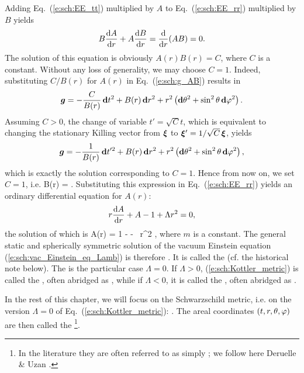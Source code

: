 Adding Eq.~(\ref{e:sch:EE_tt}) multiplied by $A$ to
Eq.~(\ref{e:sch:EE_rr}) multiplied by $B$ yields
\[
    B \frac{\mathrm{d} A}{\mathrm{d} r} + A \frac{\mathrm{d} B}{\mathrm{d} r} = \frac{\mathrm{d} }{\mathrm{d} r}(AB) = 0 .
\]
The solution of this equation is obviously $A(r)B(r) = C$, where $C$ is a constant.
Without any loss of generality, we may choose $C=1$. Indeed, substituting
$C/B(r)$ for $A(r)$ in Eq.~(\ref{e:sch:g_AB}) results in
\[
    \bm{g} = -\frac{C}{B(r)}\, \mathbf{d} t^2 + B(r)\, \mathbf{d} r^2 +
        r^2 \left( \mathbf{d}\theta^2 + \sin^2\theta\, \mathbf{d}\varphi^2 \right) .
\]
Assuming $C>0$, the change of variable $t' = \sqrt{C} t$, which is equivalent
to changing the stationary Killing vector from $\bm{\xi}$ to
$\bm{\xi}'=  1/\sqrt{C}\, \bm{\xi}$,
yields
\[
    \bm{g} = -\frac{1}{B(r)}\, \mathbf{d} t'^2 + B(r)\, \mathbf{d} r^2 +
        r^2 \left( \mathbf{d}\theta^2 + \sin^2\theta\, \mathbf{d}\varphi^2 \right) ,
\]
which is exactly the solution corresponding to $C=1$. Hence from now on,
we set $C=1$, i.e.
\be
    B(r) =  .
\ee
Substituting this expression in Eq.~(\ref{e:sch:EE_rr}) yields an ordinary
differential equation for $A(r)$:
\[
    r \frac{\mathrm{d} A}{\mathrm{d} r} + A - 1 + \Lambda r^2 = 0 ,
\]
the solution of which is
\be
    A(r) = 1 -  -  \,  r^2 ,
\ee
where $m$ is a constant.
The general static and spherically symmetric solution of the vacuum
Einstein equation (\ref{e:sch:vac_Einstein_eq_Lamb}) is therefore
\be \label{e:sch:Kottler_metric}
    .
\ee
It is called the  (cf. the historical
note below).
The   is the
particular case $\Lambda=0$. If $\Lambda>0$,
(\ref{e:sch:Kottler_metric}) is called the
,
often abridged as , while if $\Lambda<0$, it
is called the ,
often abridged as .

In the rest of this chapter, we will focus on the Schwarzschild metric,
i.e. on the version $\Lambda=0$ of Eq.~(\ref{e:sch:Kottler_metric}):
\be \label{e:sch:Schwarz_metric_SD}
    .
\ee
The areal coordinates $(t,r,\theta,\varphi)$ are then called the
\footnote{In the literature they are often referred to as simply
; we follow
here Deruelle \& Uzan \cite{DerueU14,DerueU18}.}.

